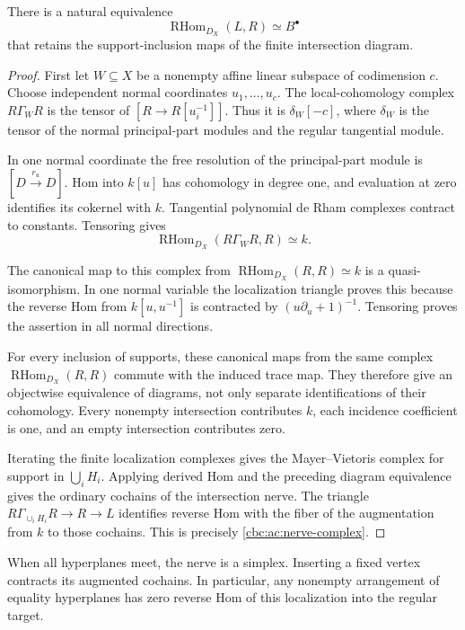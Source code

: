 \begin{theorem}\label{cbc:ac:spatial-nerve}
There is a natural equivalence
\[
 \operatorname{RHom}_{D_X}(L,R)\simeq B^\bullet
\]
that retains the support-inclusion maps of the
finite intersection diagram.
\end{theorem}
\begin{proof}
First let $W\subseteq X$ be a nonempty affine
linear subspace of codimension $c$. Choose
independent normal coordinates $u_1,\ldots,u_c$.
The local-cohomology complex $R\Gamma_W R$ is
the tensor of $[R\to R[u_i^{-1}]]$.
Thus it is $\delta_W[-c]$, where $\delta_W$
is the tensor of the normal principal-part
modules and the regular tangential module.

In one normal coordinate the free resolution of
the principal-part module is
$[D\xrightarrow{r_u}D]$.
Hom into $k[u]$ has cohomology in degree one,
and evaluation at zero identifies its cokernel
with $k$. Tangential polynomial de Rham
complexes contract to constants. Tensoring gives
\[
 \operatorname{RHom}_{D_X}(R\Gamma_W R,R)\simeq k.
\]

The canonical map to this complex from
$\operatorname{RHom}_{D_X}(R,R)\simeq k$
is a quasi-isomorphism. In one normal variable
the localization triangle proves this because
the reverse Hom from $k[u,u^{-1}]$ is
contracted by $(u\partial_u+1)^{-1}$.
Tensoring proves the assertion in all normal
directions.

For every inclusion of supports, these canonical
maps from the same complex
$\operatorname{RHom}_{D_X}(R,R)$ commute with
the induced trace map. They therefore give an
objectwise equivalence of diagrams, not only
separate identifications of their cohomology.
Every nonempty intersection contributes $k$,
each incidence coefficient is one, and an
empty intersection contributes zero.

Iterating the finite localization complexes
gives the Mayer--Vietoris complex for support
in $\bigcup_iH_i$. Applying derived Hom and
the preceding diagram equivalence gives the
ordinary cochains of the intersection nerve.
The triangle
$R\Gamma_{\cup_iH_i}R\to R\to L$ identifies
reverse Hom with the fiber of the augmentation
from $k$ to those cochains.
This is precisely \eqref{cbc:ac:nerve-complex}.
\end{proof}

When all hyperplanes meet, the nerve is a simplex.
Inserting a fixed vertex contracts its augmented
cochains. In particular, any nonempty arrangement
of equality hyperplanes has zero reverse Hom of
this localization into the regular target.

